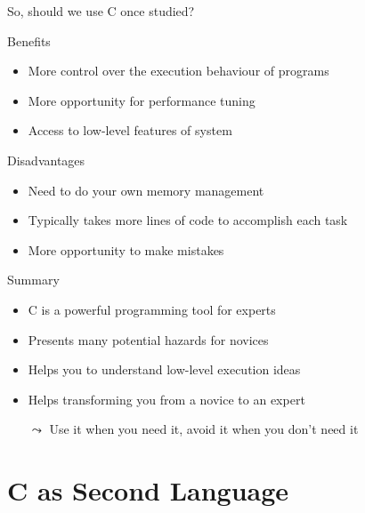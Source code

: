 \begin{frame}{So, should we use C once studied?}
  \begin{block}{Benefits}
    \begin{itemize}
    \item More control over the execution behaviour of programs
    \item More opportunity for performance tuning
    \item Access to low-level features of system
    \end{itemize}
  \end{block}\vspace{-.5\baselineskip}
  \begin{block}{Disadvantages}
    \begin{itemize}
    \item Need to do your own memory management
    \item Typically takes more lines of code to accomplish each task
    \item More opportunity to make mistakes
    \end{itemize}
  \end{block}\vspace{-.5\baselineskip}
  \begin{block}{Summary}
    \begin{itemize}
    \item C is a powerful programming tool for experts
    \item Presents many potential hazards for novices
    \item Helps you to understand low-level execution ideas
    \item Helps transforming you from a novice to an expert
    \item[$\leadsto$] Use it when you need it, avoid it when you don't need it
    \end{itemize}
  \end{block}  
\end{frame}
\section{C as Second Language}\sectionpage
